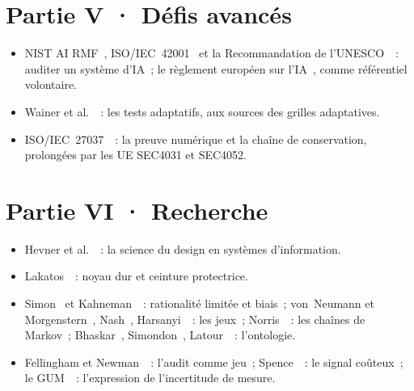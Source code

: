 \section*{Partie V · Défis avancés}

\begin{itemize}
    \item NIST AI RMF~\cite{nist2023airmf}, ISO/IEC~42001~\cite{iso42001_2023}
          et la Recommandation de l'UNESCO~\cite{unesco2021ethique}~: auditer
          un système d'IA~; le règlement européen sur
          l'IA~\cite{ue2024aiact}, comme référentiel volontaire.
    \item Wainer et al.~\cite{wainer2000cat}~: les tests adaptatifs, aux
          sources des grilles adaptatives.
    \item ISO/IEC~27037~\cite{iso27037_2012}~: la preuve numérique et la
          chaîne de conservation, prolongées par les UE SEC4031 et SEC4052.
\end{itemize}

\section*{Partie VI · Recherche}

\begin{itemize}
    \item Hevner et al.~\cite{hevner2004design}~: la science du design en
          systèmes d'information.
    \item Lakatos~\cite{lakatos1970}~: noyau dur et ceinture protectrice.
    \item Simon~\cite{simon1957} et Kahneman~\cite{kahneman2011}~:
          rationalité limitée et biais~; von~Neumann et
          Morgenstern~\cite{vonneumann1944}, Nash~\cite{nash1951},
          Harsanyi~\cite{harsanyi1967}~: les jeux~; Norris~\cite{norris1998}~:
          les chaînes de Markov~; Bhaskar~\cite{bhaskar1975},
          Simondon~\cite{simondon1958}, Latour~\cite{latour2005}~: l'ontologie.
    \item Fellingham et Newman~\cite{fellingham1985strategic}~: l'audit
          comme jeu~; Spence~\cite{spence1973signaling}~: le signal
          coûteux~; le GUM~\cite{jcgm2008gum}~: l'expression de l'incertitude
          de mesure.
\end{itemize}
